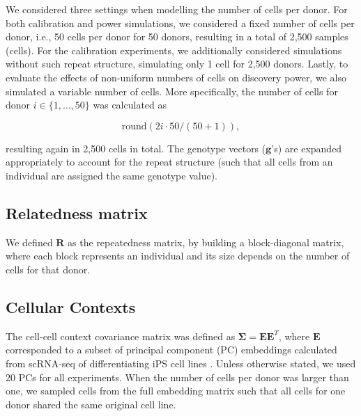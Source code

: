 We considered three settings when modelling the number of cells per donor. 
For both calibration and power simulations, we considered a fixed number of cells per donor, i.e., 50 cells per donor for 50 donors, resulting in a total of 2,500 samples (cells). 
For the calibration experiments, we additionally considered simulations without such repeat structure, simulating only 1 cell for 2,500 donors. 
Lastly, to evaluate the effects of non-uniform numbers of cells on discovery power, we also simulated a variable number of cells. 
More specifically, the number of cells for donor $i\in\{1,\dots,50\}$ was calculated as

\begin{equation}
   \text{round}(2i\cdot 50 / (50 + 1)),
\end{equation}

resulting again in 2,500 cells in total. 
The genotype vectors ($\mathbf{g}$'s) are expanded appropriately to account for the repeat structure (such that all cells from an individual are assigned the same genotype value).


\subsection{Relatedness matrix}


We defined $\mathbf{R}$ as the repeatedness matrix, by building a block-diagonal matrix, where each block represents an individual and its size depends on the number of cells for that donor.

\subsection{Cellular Contexts}

The cell-cell context covariance matrix was defined as $\boldsymbol{\Sigma} = \mathbf{E}\mathbf{E}^T$, where $\mathbf{E}$ corresponded to a subset of principal component (PC) embeddings calculated from scRNA-seq of differentiating iPS cell lines \cite{cuomo2020single}. 
Unless otherwise stated, we used 20 PCs for all experiments. 
When the number of cells per donor was larger than one, we sampled cells from the full embedding matrix such that all cells for one donor shared the same original cell line.

